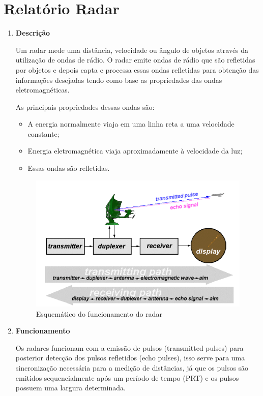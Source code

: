 \chapter[Radar]{Relatório Radar}
\begin{enumerate}

\item \textbf{Descrição}

Um radar mede uma distância, velocidade ou ângulo de objetos através da utilização de ondas de rádio. O radar emite ondas de rádio que são refletidas por objetos e depois capta e processa essas ondas refletidas para obtenção das informações desejadas tendo como base as propriedades das ondas eletromagnéticas.

As principais propriedades dessas ondas são:

\begin{itemize}
  \item A energia normalmente viaja em uma linha reta a uma velocidade constante;
  \item Energia eletromagnética viaja aproximadamente à velocidade da luz;
  \item Essas ondas são refletidas.
\end{itemize}

\begin{figure}[h]
  \centering
  \includegraphics[width=400px, scale=1]{figuras/funcionamento_radar}
  \caption{Esquemático do funcionamento do radar}
\label{fig:funcionamento_radar}
\end{figure}

\item \textbf{Funcionamento}

Os radares funcionam com a emissão de pulsos (transmitted pulses) para posterior detecção dos pulsos refletidos
(echo pulses), isso serve para uma sincronização necessária para a medição de distâncias, já que os pulsos
 são emitidos sequencialmente após um período de tempo (PRT) e os pulsos possuem
  uma largura determinada.


\end{enumerate}

